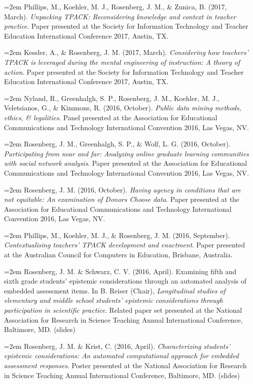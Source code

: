 \documentclass[14,]{article}
\begin{document}
\hangindent=2em Phillips, M., Koehler, M. J., Rosenberg, J. M., \&
Zunica, B. (2017, March). \emph{Unpacking TPACK: Reconsidering knowledge
and context in teacher practice}. Paper presented at the Society for
Information Technology and Teacher Education International Conference
2017, Austin, TX.

\hangindent=2em Kessler, A., \& Rosenberg, J. M. (2017, March).
\emph{Considering how teachers' TPACK is leveraged during the mental
engineering of instruction: A theory of action}. Paper presented at the
Society for Information Technology and Teacher Education International
Conference 2017, Austin, TX.

\hangindent=2em Nyland, R., Greenhalgh, S. P., Rosenberg, J. M.,
Koehler, M. J., Veletsianos, G., \& Kimmons, R. (2016, October).
\emph{Public data mining methods, ethics, \& legalities}. Panel
presented at the Association for Educational Communications and
Technology International Convention 2016, Las Vegas, NV.

\hangindent=2em Rosenberg, J. M., Greenhalgh, S. P., \& Wolf, L. G.
(2016, October). \emph{Participating from near and far: Analyzing online
graduate learning communities with social network analysis}. Paper
presented at the Association for Educational Communications and
Technology International Convention 2016, Las Vegas, NV.

\hangindent=2em Rosenberg, J. M. (2016, October). \emph{Having agency in
conditions that are not equitable: An examination of Donors Choose
data}. Paper presented at the Association for Educational Communications
and Technology International Convention 2016, Las Vegas, NV.

\hangindent=2em Phillips, M., Koehler, M. J., \& Rosenberg, J. M. (2016,
September). \emph{Contextualising teachers' TPACK development and
enactment}. Paper presented at the Australian Council for Computers in
Education, Brisbane, Australia.

\hangindent=2em Rosenberg, J. M. \& Schwarz, C. V. (2016, April).
Examining fifth and sixth grade students' epistemic considerations
through an automated analysis of embedded assessment items. In B. Reiser
(Chair), \emph{Longitudinal studies of elementary and middle school
students' epistemic considerations through participation in scientific
practice}. Related paper set presented at the National Association for
Research in Science Teaching Annual International Conference, Baltimore,
MD. (slides)

\hangindent=2em Rosenberg, J. M. \& Krist, C. (2016, April).
\emph{Characterizing students' epistemic considerations: An automated
computational approach for embedded assessment responses}. Poster
presented at the National Association for Research in Science Teaching
Annual International Conference, Baltimore, MD. (slides)
\end{document}
